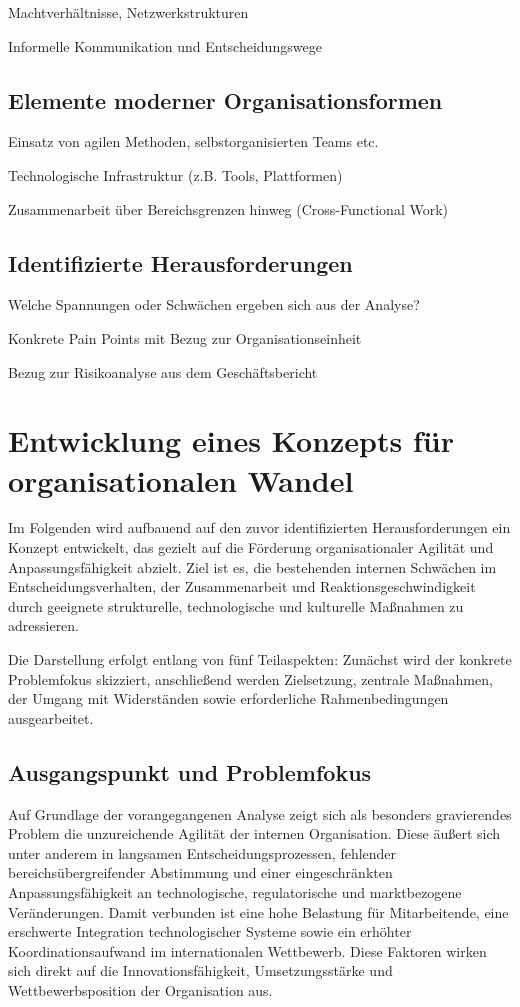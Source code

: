 \documentclass[12pt,a4paper]{article}
\begin{document}
	Machtverhältnisse, Netzwerkstrukturen
	
	Informelle Kommunikation und Entscheidungswege
	\subsection{Elemente moderner Organisationsformen}
	Einsatz von agilen Methoden, selbstorganisierten Teams etc.
	
	Technologische Infrastruktur (z.B. Tools, Plattformen)
	
	Zusammenarbeit über Bereichsgrenzen hinweg (Cross-Functional Work)
	\subsection{Identifizierte Herausforderungen}
	
	Welche Spannungen oder Schwächen ergeben sich aus der Analyse?
	
	Konkrete Pain Points mit Bezug zur Organisationseinheit
	
	Bezug zur Risikoanalyse aus dem Geschäftsbericht
	
	\section{Entwicklung eines Konzepts für organisationalen Wandel}
	Im Folgenden wird aufbauend auf den zuvor identifizierten Herausforderungen ein Konzept entwickelt, das gezielt auf die Förderung organisationaler Agilität und Anpassungsfähigkeit abzielt. Ziel ist es, die bestehenden internen Schwächen im Entscheidungsverhalten, der Zusammenarbeit und Reaktionsgeschwindigkeit durch geeignete strukturelle, technologische und kulturelle Maßnahmen zu adressieren.
	
	\noindent Die Darstellung erfolgt entlang von fünf Teilaspekten: Zunächst wird der konkrete Problemfokus skizziert, anschließend werden Zielsetzung, zentrale Maßnahmen, der Umgang mit Widerständen sowie erforderliche Rahmenbedingungen ausgearbeitet.
	\subsection{Ausgangspunkt und Problemfokus}
	
	Auf Grundlage der vorangegangenen Analyse zeigt sich als besonders gravierendes Problem die unzureichende Agilität der internen Organisation. Diese äußert sich unter anderem in langsamen Entscheidungsprozessen, fehlender bereichsübergreifender Abstimmung und einer eingeschränkten Anpassungsfähigkeit an technologische, regulatorische und marktbezogene Veränderungen. Damit verbunden ist eine hohe Belastung für Mitarbeitende, eine erschwerte Integration technologischer Systeme sowie ein erhöhter Koordinationsaufwand im internationalen Wettbewerb. Diese Faktoren wirken sich direkt auf die Innovationsfähigkeit, Umsetzungsstärke und Wettbewerbsposition der Organisation aus.
	
\end{document}

